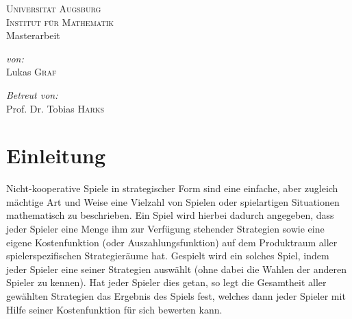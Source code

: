 \documentclass[a4paper,ngerman,11pt,bibliography=totoc]{scrartcl}
\theoremstyle{definition}
\theoremstyle{plain}
\theoremstyle{remark}
\begin{document}
	
	
	

\author{Lukas Graf}
\date{Letzte Aktualisierung: \today}

\thispagestyle{empty}


\begin{titlepage}\center
	\textsc{\LARGE Universität Augsburg}\\[1cm]
	
	\textsc{\Large Institut für Mathematik}\\[1.5cm]
	
	{\Large Masterarbeit \\[1cm]}
	{\huge {}}

	\vfill
	
	\begin{minipage}{0.4\textwidth}
		\begin{flushleft} \large
			\emph{von:}\\
			Lukas \textsc{Graf}
		\end{flushleft}
	\end{minipage}
	\begin{minipage}{0.4\textwidth}
		\begin{flushright} \large
			\emph{Betreut von:} \\
			Prof. Dr. Tobias \textsc{Harks}
		\end{flushright}
	\end{minipage}
	
\end{titlepage}


\tableofcontents

\listoftodos

\newpage
{}
{}
\section*{Einleitung}

Nicht-kooperative Spiele in strategischer Form sind eine einfache, aber zugleich mächtige Art und Weise eine Vielzahl von Spielen oder spielartigen Situationen mathematisch zu beschrieben. Ein Spiel wird hierbei dadurch angegeben, dass jeder Spieler eine Menge ihm zur Verfügung stehender Strategien sowie eine eigene Kostenfunktion (oder Auszahlungsfunktion) auf dem Produktraum aller spielerspezifischen Strategieräume hat. \glqq Gespielt\grqq{} wird ein solches Spiel, indem jeder Spieler eine seiner Strategien auswählt (ohne dabei die Wahlen der anderen Spieler zu kennen). Hat jeder Spieler dies getan, so legt die Gesamtheit aller gewählten Strategien das Ergebnis des Spiels fest, welches dann jeder Spieler mit Hilfe seiner Kostenfunktion für sich bewerten kann.
\end{document}
